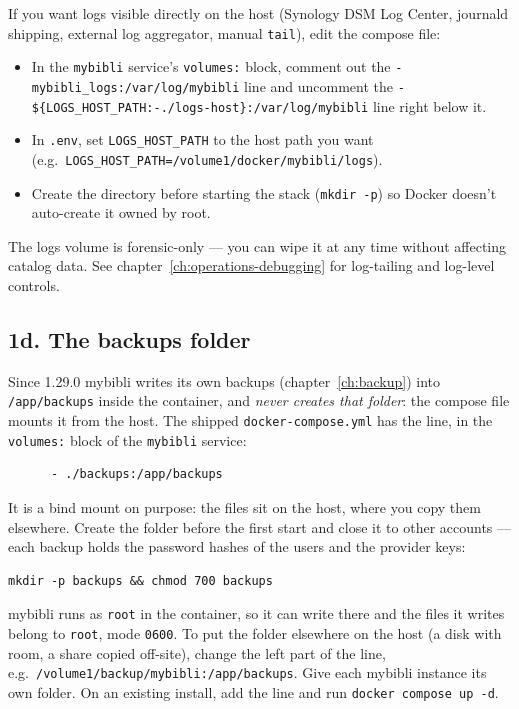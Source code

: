 If you want logs visible directly on the host (Synology DSM Log
Center, journald shipping, external log aggregator, manual
\texttt{tail}), edit the compose file:

\begin{itemize}
  \item In the \texttt{mybibli} service's \texttt{volumes:} block,
        comment out the \texttt{- mybibli\_logs:/var/log/mybibli} line
        and uncomment the
        \texttt{- \$\{LOGS\_HOST\_PATH:-./logs-host\}:/var/log/mybibli}
        line right below it.
  \item In \texttt{.env}, set \texttt{LOGS\_HOST\_PATH} to the host
        path you want (e.g.\
        \texttt{LOGS\_HOST\_PATH=/volume1/docker/mybibli/logs}).
  \item Create the directory before starting the stack
        (\texttt{mkdir -p}) so Docker doesn't auto-create it owned by
        root.
\end{itemize}

The logs volume is forensic-only — you can wipe it at any time
without affecting catalog data. See chapter~\ref{ch:operations-debugging}
for log-tailing and log-level controls.

\subsection*{1d. The backups folder}\label{sec:install-backups}

Since 1.29.0 mybibli writes its own backups (chapter~\ref{ch:backup})
into \texttt{/app/backups} inside the container, and \emph{never
creates that folder}: the compose file mounts it from the host. The
shipped \texttt{docker-compose.yml} has the line, in the
\texttt{volumes:} block of the \texttt{mybibli} service:

\begin{lstlisting}
      - ./backups:/app/backups
\end{lstlisting}

It is a bind mount on purpose: the files sit on the host, where you
copy them elsewhere. Create the folder before the first start and close
it to other accounts --- each backup holds the password hashes of the
users and the provider keys:

\begin{lstlisting}
mkdir -p backups && chmod 700 backups
\end{lstlisting}

mybibli runs as \texttt{root} in the container, so it can write there
and the files it writes belong to \texttt{root}, mode \texttt{0600}.
To put the folder elsewhere on the host (a disk with room, a share
copied off-site), change the left part of the line, e.g.\
\texttt{/volume1/backup/mybibli:/app/backups}. Give each mybibli
instance its own folder. On an existing install, add the line and run
\texttt{docker compose up -d}.

